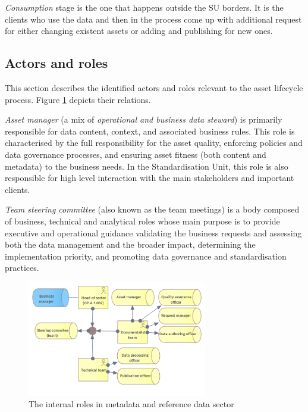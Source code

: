 	\textit{Consumption} stage is the one that happens outside the SU borders. It is the clients who use the data and then in the process come up with additional request for either changing existent assets or adding and publishing for new ones. 
	
	\subsection{Actors and roles}
	\label{sec:lifecycle-roles}	
	
	This section describes the identified actors and roles relevant to the asset lifecycle process. Figure \ref{fig:internal-roles} depicts their relations.
		
	\textit{Asset manager} (a mix of \textit{operational and business data steward}) is primarily responsible for data content, context, and associated business rules. This role is characterised by the full responsibility for the asset quality, enforcing policies and data governance processes, and ensuring asset fitness (both content and metadata) to the business needs. In the Standardisation Unit, this role is also responsible for high level interaction with the main stakeholders and important clients.
	
	\textit{Team steering committee} (also known as the team meetings) is a body composed of business, technical and analytical roles whose main purpose is to provide executive and operational guidance validating the business requests and assessing both the data management  and the broader impact, determining the implementation priority, and promoting data governance and standardisation practices.
	
	
	\begin{figure}[h]
		\centering
		\includegraphics[width=0.7\textwidth]{images/business/Internal Roles.png}
		\caption{The internal roles in metadata and reference data sector}
		\label{fig:internal-roles}
	\end{figure}
	
